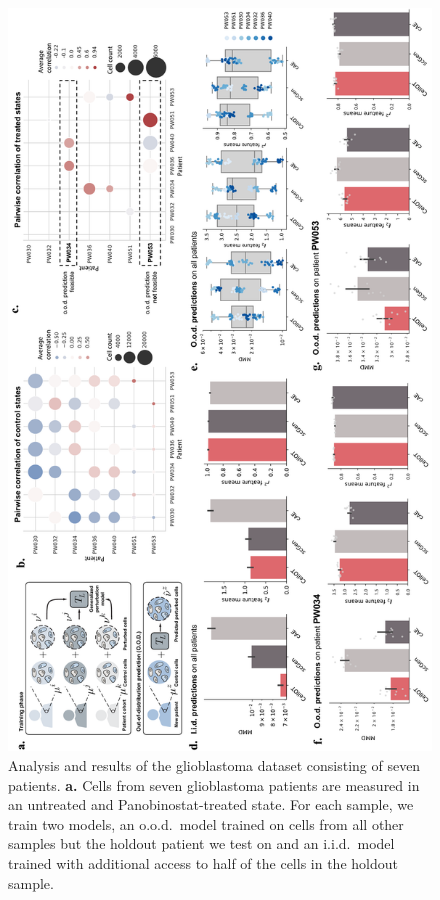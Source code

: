 \newpage
\begin{figure}[p]
     \centering
     \includegraphics[width=1.05\textwidth]{figures/fig_gbm_patients_iid_ood.pdf}
     \caption{Analysis and results of the glioblastoma dataset consisting of seven patients. \textbf{a.} Cells from seven glioblastoma patients are measured in an untreated and Panobinostat-treated state. For each sample, we train two models, an o.o.d.~model trained on cells from all other samples but the holdout patient we test on and an i.i.d.~model trained with additional access to half of the cells in the holdout sample.
}
\end{figure}
